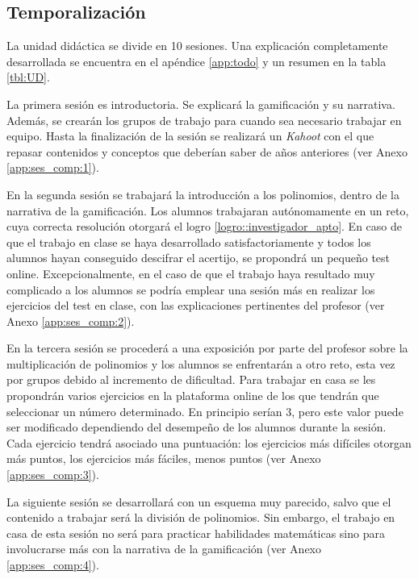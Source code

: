\subsection{Temporalización}

La unidad didáctica se divide en 10 sesiones. 
%
Una explicación completamente desarrollada se encuentra en el apéndice \ref{app:todo} y un resumen en la tabla \ref{tbl:UD}.


%
La primera sesión es introductoria.
%
Se explicará la gamificación y su narrativa. 
%
Además, se crearán los grupos de trabajo para cuando sea necesario trabajar en equipo.
%
Hasta la finalización de la sesión se realizará un \textit{Kahoot} con el que repasar contenidos y conceptos que deberían saber de años anteriores (ver Anexo \ref{app:ses_comp:1}).


%
En la segunda sesión se trabajará la introducción a los polinomios, dentro de la narrativa de la gamificación. 
%
Los alumnos trabajaran autónomamente en un reto, cuya correcta resolución otorgará el logro \ref{logro::investigador_apto}.
%
En caso de que el trabajo en clase se haya desarrollado satisfactoriamente y todos los alumnos hayan conseguido descifrar el acertijo, se propondrá un pequeño test online.
%
Excepcionalmente, en el caso de que el trabajo haya resultado muy complicado a los alumnos se podría emplear una sesión más en realizar los ejercicios del test en clase, con las explicaciones pertinentes del profesor (ver Anexo \ref{app:ses_comp:2}).


%
En la tercera sesión se procederá a una exposición por parte del profesor sobre la multiplicación de polinomios y los alumnos se enfrentarán a otro reto, esta vez por grupos debido al incremento de dificultad.
%
Para trabajar en casa se les propondrán varios ejercicios en la plataforma online de los que tendrán que seleccionar un número determinado. 
%
En principio serían 3, pero este valor puede ser modificado dependiendo del desempeño de los alumnos durante la sesión.
%
Cada ejercicio tendrá asociado una puntuación: los ejercicios más difíciles otorgan más puntos, los ejercicios más fáciles, menos puntos (ver Anexo \ref{app:ses_comp:3}).


%
La siguiente sesión se desarrollará con un esquema muy parecido, salvo que el contenido a trabajar será la división de polinomios.
%
Sin embargo, el trabajo en casa de esta sesión no será para practicar habilidades matemáticas sino para involucrarse más con la narrativa de la gamificación (ver Anexo \ref{app:ses_comp:4}).


